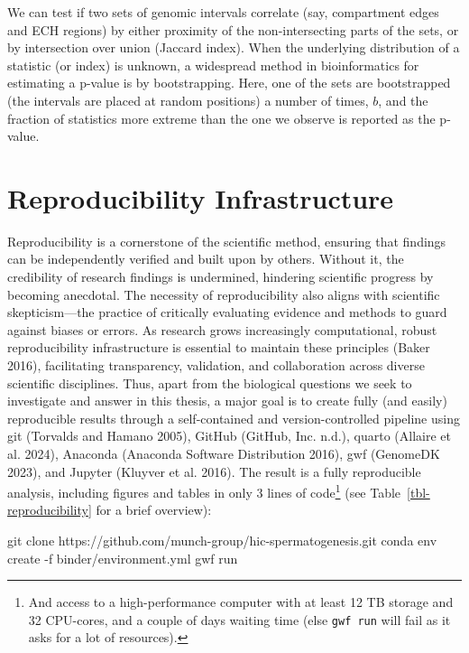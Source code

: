 \documentclass[
  11pt,
  a4paper,
]{scrbook}
\newenvironment{Shaded}{\begin{snugshade}}{\end{snugshade}}
\newcommand{\NormalTok}[1]{\textcolor[rgb]{0.12,0.11,0.11}{#1}}
\begin{document}
We can test if two sets of genomic intervals correlate (say, compartment
edges and ECH regions) by either proximity of the non-intersecting parts
of the sets, or by intersection over union (Jaccard index). When the
underlying distribution of a statistic (or index) is unknown, a
widespread method in bioinformatics for estimating a p-value is by
bootstrapping. Here, one of the sets are bootstrapped (the intervals are
placed at random positions) a number of times, \(b\), and the fraction
of statistics more extreme than the one we observe is reported as the
p-value.

\section{Reproducibility
Infrastructure}\label{reproducibility-infrastructure}

Reproducibility is a cornerstone of the scientific method, ensuring that
findings can be independently verified and built upon by others. Without
it, the credibility of research findings is undermined, hindering
scientific progress by becoming anecdotal. The necessity of
reproducibility also aligns with scientific skepticism---the practice of
critically evaluating evidence and methods to guard against biases or
errors. As research grows increasingly computational, robust
reproducibility infrastructure is essential to maintain these principles
(Baker 2016), facilitating transparency, validation, and collaboration
across diverse scientific disciplines. Thus, apart from the biological
questions we seek to investigate and answer in this thesis, a major goal
is to create fully (and easily) reproducible results through a
self-contained and version-controlled pipeline using git (Torvalds and
Hamano 2005), GitHub (GitHub, Inc. n.d.), quarto (Allaire et al. 2024),
Anaconda (Anaconda Software Distribution 2016), gwf (GenomeDK 2023), and
Jupyter (Kluyver et al. 2016). The result is a fully reproducible
analysis, including figures and tables in only 3 lines of
code\footnote{And access to a high-performance computer with at least 12
  TB storage and 32 CPU-cores, and a couple of days waiting time (else
  \texttt{gwf\ run} will fail as it asks for a lot of resources).} (see
Table~\ref{tbl-reproducibility} for a brief overview):

\small

\begin{Shaded}
\begin{Highlighting}[numbers=left,,]
\NormalTok{  git clone https://github.com/munch{-}group/hic{-}spermatogenesis.git}
\NormalTok{  conda env create {-}f binder/environment.yml}
\NormalTok{  gwf run}
\end{Highlighting}
\end{Shaded}
\end{document}
